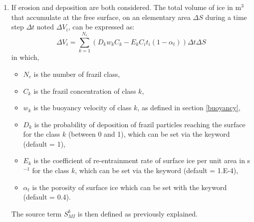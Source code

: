 \begin{enumerate}
\item If  erosion and deposition are both considered.
The total volume of ice in m$^3$ that accumulate at the free surface, on an elementary area $\Delta S$ during a time step $\Delta t$ noted $\Delta V_i$, can be expressed as:
\begin{equation}
\Delta V_i = \sum_{k=1}^{N_c} \left( D_k w_k C_k - E_k C_i t_i(1-\alpha_t) \right) \Delta t \Delta S 
\end{equation}
in which,
\begin{itemize}
  \item $N_c$ is the number of frazil class,
  \item $C_k$ is the frazil concentration of class $k$,
  \item $w_k$ is the buoyancy velocity of class $k$, as defined in section \ref{buoyancy},
  \item $D_k$ is the probability of deposition of frazil particles reaching the surface for the class $k$ (between 0 and 1), which can be set via the keyword  (default = 1),
  \item $E_k$ is the coefficient of re-entrainment rate of surface ice per unit area in s$^{-1}$ for the class $k$, which can be set via the keyword  (default = 1.E-4),
  \item $\alpha_t$ is the porosity of surface ice which can be set with the keyword  (default = 0.4).
\end{itemize}
The source term $S_{MI}^k$ is then defined as previously explained. 

\end{enumerate}



